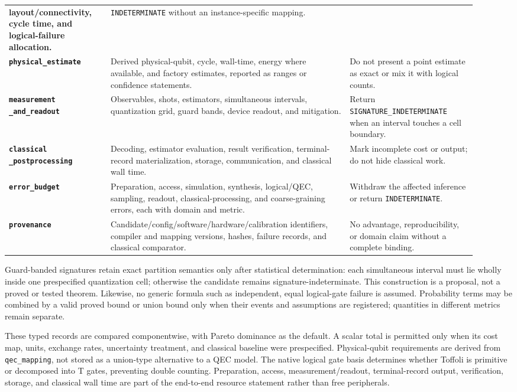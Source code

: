 \begin{longtable}{>{\bfseries}p{0.20\linewidth}p{0.47\linewidth}p{0.25\linewidth}}
layout/connectivity, cycle time, and logical-failure allocation. & \texttt{INDETERMINATE} without
an instance-specific mapping.\\
\texttt{physical\_estimate} & Derived physical-qubit, cycle, wall-time, energy where available,
and factory estimates, reported as ranges or confidence statements. & Do not present a point
estimate as exact or mix it with logical counts.\\
\shortstack[l]{\texttt{measurement}\\\texttt{\_and\_readout}} & Observables, shots, estimators, simultaneous intervals,
quantization grid, guard bands, device readout, and mitigation. & Return
\texttt{SIGNATURE\_INDETERMINATE} when an interval touches a cell boundary.\\
\shortstack[l]{\texttt{classical}\\\texttt{\_postprocessing}} & Decoding, estimator evaluation, result verification,
terminal-record materialization, storage, communication, and classical wall time. & Mark
incomplete cost or output; do not hide classical work.\\
\texttt{error\_budget} & Preparation, access, simulation, synthesis, logical/QEC, sampling,
readout, classical-processing, and coarse-graining errors, each with domain and metric. & Withdraw
the affected inference or return \texttt{INDETERMINATE}.\\
\texttt{provenance} & Candidate/config/software/hardware/calibration identifiers, compiler and
mapping versions, hashes, failure records, and classical comparator. & No advantage,
reproducibility, or domain claim without a complete binding.\\
\bottomrule
\end{longtable}

Guard-banded signatures retain exact partition semantics only after statistical determination:
each simultaneous interval must lie wholly inside one prespecified quantization cell; otherwise
the candidate remains signature-indeterminate. This construction is a proposal, not a proved or
tested theorem. Likewise, no generic formula such as independent, equal logical-gate failure is
assumed. Probability terms may be combined by a valid proved bound or union bound only when their
events and assumptions are registered; quantities in different metrics remain separate.

These typed records are compared componentwise, with Pareto dominance as the default. A scalar
total is permitted only when its cost map, units, exchange rates, uncertainty treatment, and
classical baseline were prespecified. Physical-qubit requirements are derived from
\texttt{qec\_mapping}, not stored as a union-type alternative to a QEC model. The native logical
gate basis determines whether Toffoli is primitive or decomposed into T gates, preventing double
counting. Preparation, access, measurement/readout, terminal-record output, verification, storage,
and classical wall time are part of the end-to-end resource statement rather than free peripherals.

